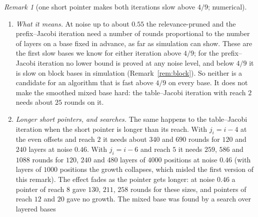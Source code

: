 \documentclass[11pt]{amsart}
\theoremstyle{definition}
\theoremstyle{remark}
\newtheorem{remark}[theorem]{Remark}
\begin{document}
\begin{remark}[one short pointer makes both iterations slow above $4/9$; numerical]
\begin{enumerate}[label=(\roman*),leftmargin=2.4em]
The two facts alone do not account for the growth: the gates they cover pass on the depth of
$0.37$ positions of the layer below on average at noise $0.50$, and the depth also survives two
thirds of the resampled even gates. The referee measured the multiplier directly, by marking a
sparse set of even positions of one layer as infinitely deep and counting the positions of the
layers above that inherit this: it is $1.31$, $1.20$, $1.03$, $1.00$, $0.94$, $0.87$ at noise
$0.50$, $0.52$, $0.54$, $0.55$, $0.56$, $0.58$, where the same measurement on block bases returns
$\lambda$ ($0.900$ against $0.899$ at noise $0.50$). When the kept pointers $j_i=i-2$ are not
allowed to pass on an open status, the multiplier drops to $0.98$, $0.88$, $0.78$ at noise $0.46$,
$0.50$, $0.52$. So it is the depth passed through the pointers of reach $2$ that puts this base
above $1$. The prefix--Jacobi iteration reads the previous iterate through these pointers as
through all others, and needs as many rounds. The table--Jacobi iteration with reach $2$ reads
the current iterate through them; it needs about as many rounds as the zero gates below the
layers need by themselves.
\item \emph{What it means.} At noise up to about $0.55$ the relevance-pruned and the
prefix--Jacobi iteration need a number of rounds proportional to the number of layers on a base
fixed in advance, as far as simulation can show. These are the first slow bases we know for
either iteration above $4/9$; for the prefix--Jacobi iteration no lower bound is proved at any
noise level, and below $4/9$ it is slow on block bases in simulation
(Remark~\ref{rem:block}). So neither is a candidate for an algorithm that is fast above $4/9$
on every base. It does not make the smoothed mixed base hard: the table--Jacobi iteration with
reach $2$ needs about $25$ rounds on it.
\item \emph{Longer short pointers, and searches.} The same happens to the table--Jacobi
iteration when the short pointer is longer than its reach. With $j_i=i-4$ at the even offsets
and reach $2$ it needs about $340$ and $690$ rounds for $120$ and $240$ layers at noise $0.46$.
With $j_i=i-6$ and reach $5$ it needs $259$, $586$ and $1088$ rounds for $120$, $240$ and $480$
layers of $4000$ positions at noise $0.46$ (with layers of $1000$ positions the growth collapses,
which misled the first version of this remark). The effect fades as the pointer gets longer: at
noise $0.46$ a pointer of reach $8$ gave $130$, $211$, $258$ rounds for these sizes, and pointers
of reach $12$ and $20$ gave no growth. The mixed base was found by a search over layered bases

\end{enumerate}
\end{remark}
\end{document}
